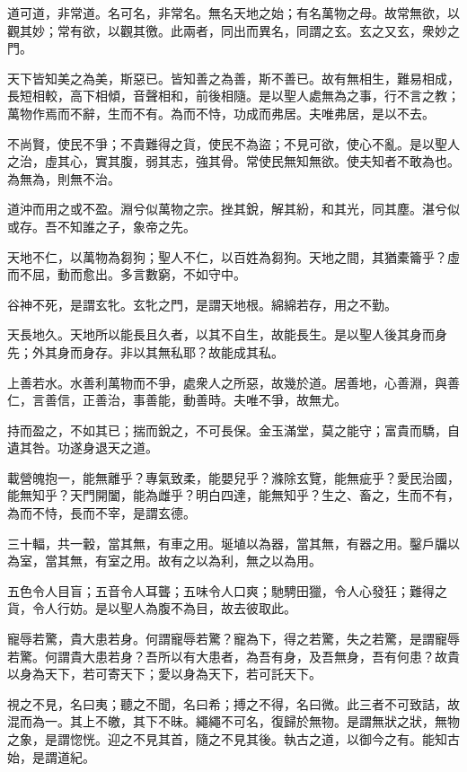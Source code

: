 ﻿

\begin{pinyinscope}
道可道，非常道。名可名，非常名。無名天地之始；有名萬物之母。故常無欲，以觀其妙；常有欲，以觀其徼。此兩者，同出而異名，同謂之玄。玄之又玄，衆妙之門。

天下皆知美之為美，斯惡已。皆知善之為善，斯不善已。故有無相生，難易相成，長短相較，高下相傾，音聲相和，前後相隨。是以聖人處無為之事，行不言之教；萬物作焉而不辭，生而不有。為而不恃，功成而弗居。夫唯弗居，是以不去。

不尚賢，使民不爭；不貴難得之貨，使民不為盜；不見可欲，使心不亂。是以聖人之治，虛其心，實其腹，弱其志，強其骨。常使民無知無欲。使夫知者不敢為也。為無為，則無不治。

道沖而用之或不盈。淵兮似萬物之宗。挫其銳，解其紛，和其光，同其塵。湛兮似或存。吾不知誰之子，象帝之先。

天地不仁，以萬物為芻狗；聖人不仁，以百姓為芻狗。天地之間，其猶橐籥乎？虛而不屈，動而愈出。多言數窮，不如守中。

谷神不死，是謂玄牝。玄牝之門，是謂天地根。綿綿若存，用之不勤。

天長地久。天地所以能長且久者，以其不自生，故能長生。是以聖人後其身而身先；外其身而身存。非以其無私耶？故能成其私。

上善若水。水善利萬物而不爭，處衆人之所惡，故幾於道。居善地，心善淵，與善仁，言善信，正善治，事善能，動善時。夫唯不爭，故無尤。

持而盈之，不如其已；揣而銳之，不可長保。金玉滿堂，莫之能守；富貴而驕，自遺其咎。功遂身退天之道。

載營魄抱一，能無離乎？專氣致柔，能嬰兒乎？滌除玄覽，能無疵乎？愛民治國，能無知乎？天門開闔，能為雌乎？明白四達，能無知乎？生之、畜之，生而不有，為而不恃，長而不宰，是謂玄德。

三十輻，共一轂，當其無，有車之用。埏埴以為器，當其無，有器之用。鑿戶牖以為室，當其無，有室之用。故有之以為利，無之以為用。

五色令人目盲；五音令人耳聾；五味令人口爽；馳騁田獵，令人心發狂；難得之貨，令人行妨。是以聖人為腹不為目，故去彼取此。

寵辱若驚，貴大患若身。何謂寵辱若驚？寵為下，得之若驚，失之若驚，是謂寵辱若驚。何謂貴大患若身？吾所以有大患者，為吾有身，及吾無身，吾有何患？故貴以身為天下，若可寄天下；愛以身為天下，若可託天下。

視之不見，名曰夷；聽之不聞，名曰希；搏之不得，名曰微。此三者不可致詰，故混而為一。其上不皦，其下不昧。繩繩不可名，復歸於無物。是謂無狀之狀，無物之象，是謂惚恍。迎之不見其首，隨之不見其後。執古之道，以御今之有。能知古始，是謂道紀。


\end{pinyinscope}

